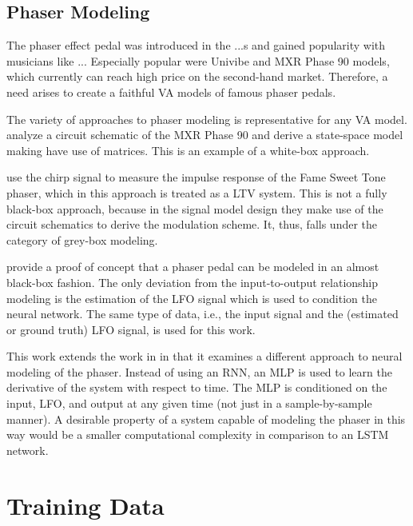 \subsection{Phaser Modeling}

The phaser effect pedal was introduced in the ...s and gained popularity with musicians like ... Especially popular were Univibe and MXR Phase 90 models, which currently can reach high price on the second-hand market. Therefore, a need arises to create a faithful \ac{VA} models of famous phaser pedals.

The variety of approaches to phaser modeling is representative for any \ac{VA} model. \cite{Eichas2014} analyze a circuit schematic of the MXR Phase 90 and derive a state-space model making have use of matrices. This is an example of a white-box approach.

\cite{Kiiski2016} use the chirp signal to measure the impulse response of the Fame Sweet Tone phaser, which in this approach is treated as a \ac{LTV} system. This is not a fully black-box approach, because in the signal model design they make use of the circuit schematics to derive the modulation scheme. It, thus, falls under the category of grey-box modeling.

\cite{Wright2020} provide a proof of concept that a phaser pedal can be modeled in an almost black-box fashion. The only deviation from the input-to-output relationship modeling is the estimation of the \ac{LFO} signal which is used to condition the neural network. The same type of data, i.e., the input signal and the (estimated or ground truth) \ac{LFO} signal, is used for this work.

This work extends the work in \cite{Wright2020} in that it examines a different approach to neural modeling of the phaser. Instead of using an \ac{RNN}, an \ac{MLP} is used to learn the derivative of the system with respect to time. The \ac{MLP} is conditioned on the input, \ac{LFO}, and output at any given time (not just in a sample-by-sample manner). A desirable property of a system capable of modeling the phaser in this way would be a smaller computational complexity in comparison to an \ac{LSTM} network.

\section{Training Data}
\label{sec:phaser_training_data}

